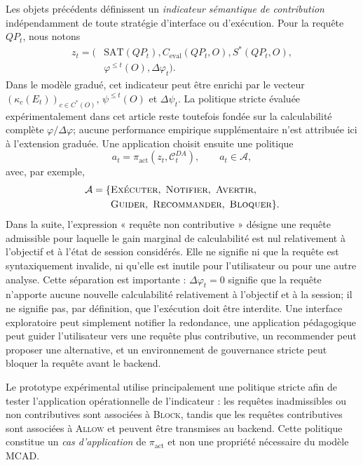 \documentclass[journal]{IEEEtran}
\begin{document}
Les objets précédents définissent un \emph{indicateur sémantique de contribution} indépendamment de toute stratégie d'interface ou d'exécution. Pour la requête $QP_t$, nous notons
\[
\begin{aligned}
z_t=\bigl(&\mathrm{SAT}(QP_t),C_{\mathrm{eval}}(QP_t,O),S^*(QP_t,O),\\
&\varphi^{\le t}(O),\Delta\varphi_t\bigr).
\end{aligned}
\]
Dans le modèle gradué, cet indicateur peut être enrichi par le vecteur $(\kappa_c(E_t))_{c\in C^*(O)}$, $\psi^{\le t}(O)$ et $\Delta\psi_t$. La politique stricte évaluée expérimentalement dans cet article reste toutefois fondée sur la calculabilité complète $\varphi/\Delta\varphi$; aucune performance empirique supplémentaire n'est attribuée ici à l'extension graduée.
Une application choisit ensuite une politique
\[
a_t=\pi_{\mathrm{act}}(z_t,\mathcal{C}^{DA}_t),\qquad
 a_t\in\mathcal{A},
\]
avec, par exemple,
\[
\begin{aligned}
\mathcal{A}=\{&\textsc{Exécuter},\ \textsc{Notifier},\ \textsc{Avertir},\\
              &\textsc{Guider},\ \textsc{Recommander},\ \textsc{Bloquer}\}.
\end{aligned}
\]
Dans la suite, l'expression « requête non contributive » désigne une requête admissible pour laquelle le gain marginal de calculabilité est nul relativement à l'objectif et à l'état de session considérés. Elle ne signifie ni que la requête est syntaxiquement invalide, ni qu'elle est inutile pour l'utilisateur ou pour une autre analyse. Cette séparation est importante : $\Delta\varphi_t=0$ signifie que la requête n'apporte aucune nouvelle calculabilité relativement à l'objectif et à la session; il ne signifie pas, par définition, que l'exécution doit être interdite. Une interface exploratoire peut simplement notifier la redondance, une application pédagogique peut guider l'utilisateur vers une requête plus contributive, un recommender peut proposer une alternative, et un environnement de gouvernance stricte peut bloquer la requête avant le backend.

Le prototype expérimental utilise principalement une politique stricte afin de tester l'application opérationnelle de l'indicateur : les requêtes inadmissibles ou non contributives sont associées à \textsc{Block}, tandis que les requêtes contributives sont associées à \textsc{Allow} et peuvent être transmises au backend. Cette politique constitue un \emph{cas d'application} de $\pi_{\mathrm{act}}$ et non une propriété nécessaire du modèle MCAD.
\end{document}
